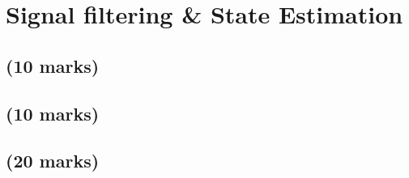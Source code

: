 \section{Signal filtering \& State Estimation}

\subsection{(10 marks)}


\subsection{(10 marks)}


\subsection{(20 marks)}

\newpage
